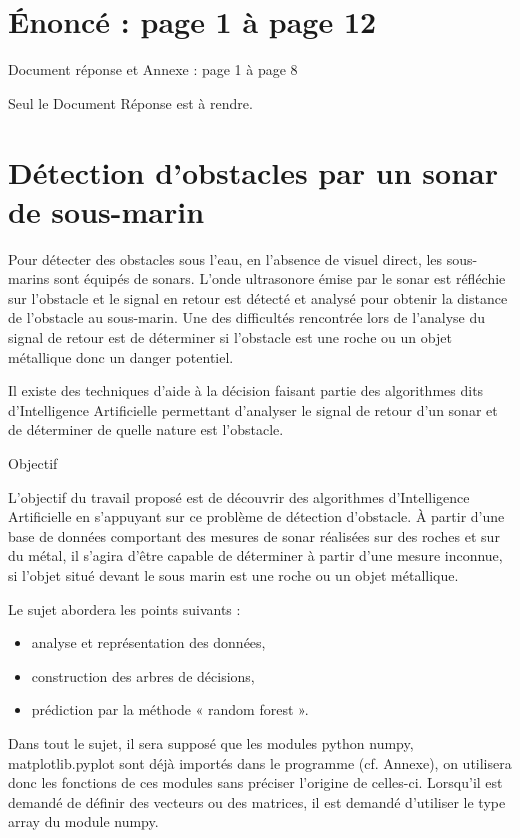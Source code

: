 \documentclass[10pt]{article}
\begin{document}
\section{Énoncé : page 1 à page 12}
Document réponse et Annexe : page 1 à page 8

Seul le Document Réponse est à rendre.

\section*{Détection d'obstacles par un sonar de sous-marin }

Pour détecter des obstacles sous l'eau, en l'absence de visuel direct, les sous-marins sont équipés de sonars. L'onde ultrasonore émise par le sonar est réfléchie sur l'obstacle et le signal en retour est détecté et analysé pour obtenir la distance de l'obstacle au sous-marin. Une des difficultés rencontrée lors de l'analyse du signal de retour est de déterminer si l'obstacle est une roche ou un objet métallique donc un danger potentiel.

Il existe des techniques d'aide à la décision faisant partie des algorithmes dits d'Intelligence Artificielle permettant d'analyser le signal de retour d'un sonar et de déterminer de quelle nature est l'obstacle.

Objectif

L'objectif du travail proposé est de découvrir des algorithmes d'Intelligence Artificielle en s'appuyant sur ce problème de détection d'obstacle. À partir d'une base de données comportant des mesures de sonar réalisées sur des roches et sur du métal, il s'agira d'être capable de déterminer à partir d'une mesure inconnue, si l'objet situé devant le sous marin est une roche ou un objet métallique.

Le sujet abordera les points suivants :

\begin{itemize}
  \item analyse et représentation des données,

  \item construction des arbres de décisions,

  \item prédiction par la méthode « random forest ».

\end{itemize}
Dans tout le sujet, il sera supposé que les modules python numpy, matplotlib.pyplot sont déjà importés dans le programme (cf. Annexe), on utilisera donc les fonctions de ces modules sans préciser l'origine de celles-ci. Lorsqu'il est demandé de définir des vecteurs ou des matrices, il est demandé d'utiliser le type array du module numpy.
\end{document}
